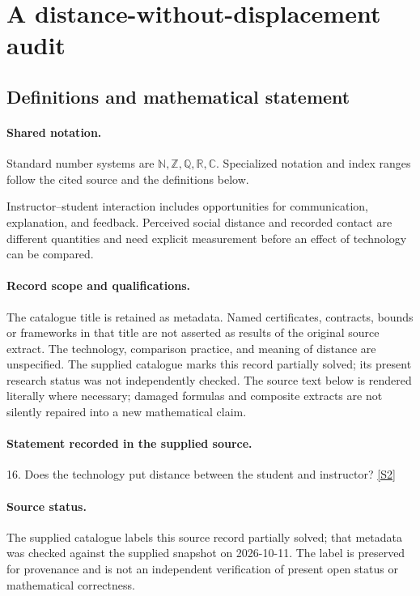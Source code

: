\documentclass[11pt]{article}
\newcommand{\sref}[2]{\hyperlink{source:#1:#2}{[S#2]}}
\begin{document}
\section{A distance-without-displacement audit}\label{statement}

\subsection{Definitions and mathematical statement}

\paragraph{Shared notation.}Standard number systems are $\mathbb N,\mathbb Z,\mathbb Q,\mathbb R,\mathbb C$. Specialized notation and index ranges follow the cited source and the definitions below.


Instructor--student interaction includes opportunities for communication, explanation, and feedback. Perceived social distance and recorded contact are different quantities and need explicit measurement before an effect of technology can be compared.
\paragraph{Record scope and qualifications.}
The catalogue title is retained as metadata. Named certificates, contracts, bounds or frameworks in that title are not asserted as results of the original source extract.
The technology, comparison practice, and meaning of distance are unspecified. The supplied catalogue marks this record partially solved; its present research status was not independently checked.
The source text below is rendered literally where necessary; damaged formulas and composite extracts are not silently repaired into a new mathematical claim.
\paragraph{Statement recorded in the supplied source.}
16. Does the technology put distance between the student and instructor? \sref{statement}{2}
\paragraph{Source status.}
The supplied catalogue labels this source record partially solved; that metadata was checked against the supplied snapshot on 2026-10-11. The label is preserved for provenance and is not an independent verification of present open status or mathematical correctness.
\end{document}
